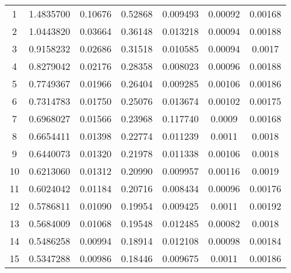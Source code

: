 \documentclass[10pt,letterpaper]{article}
\begin{document}
\begin{table}[]
\begin{tabular}{c c c c c c c}
1		& 1.4835700   & 0.10676    & 0.52868    & 0.009493  & 0.00092    & 0.00168        \\
2 		& 1.0443820   & 0.03664    & 0.36148    & 0.013218  & 0.00094    & 0.00188         \\
3		& 0.9158232   & 0.02686    & 0.31518    & 0.010585  & 0.00094    & 0.0017        \\
4		& 0.8279042   & 0.02176    & 0.28358    & 0.008023  & 0.00096    & 0.00188   	  \\
5		& 0.7749367   & 0.01966    & 0.26404    & 0.009285  & 0.00106    & 0.00186        \\
6		& 0.7314783   & 0.01750    & 0.25076    & 0.013674  & 0.00102    & 0.00175        \\
7 		& 0.6968027   & 0.01566    & 0.23968    & 0.117740  & 0.0009     & 0.00168        \\
8		& 0.6654411   & 0.01398    & 0.22774    & 0.011239  & 0.0011     & 0.0018        \\
9		& 0.6440073   & 0.01320    & 0.21978    & 0.011338  & 0.00106    & 0.0018        \\
10		& 0.6213060   & 0.01312    & 0.20990    & 0.009957  & 0.00116    & 0.0019        \\
11		& 0.6024042   & 0.01184    & 0.20716    & 0.008434  & 0.00096    & 0.00176        \\
12 		& 0.5786811   & 0.01090    & 0.19954    & 0.009425  & 0.0011     & 0.00192          \\
13		& 0.5684009   & 0.01068    & 0.19548    & 0.012485  & 0.00082    & 0.0018        \\
14		& 0.5486258   & 0.00994    & 0.18914    & 0.012108  & 0.00098    & 0.00184   	  \\
15		& 0.5347288   & 0.00986    & 0.18446    & 0.009675  & 0.0011     & 0.00186       \\

\hline
\end{tabular}
\end{table}
\end{document}
